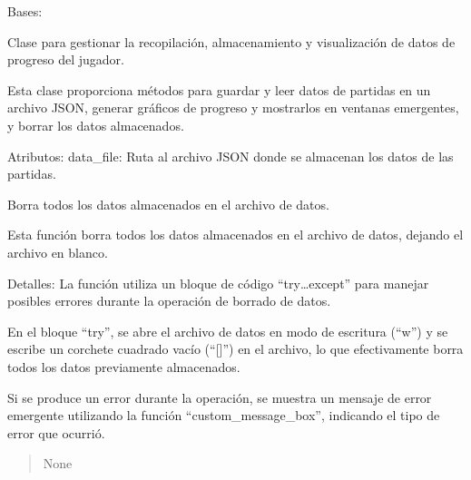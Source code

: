 \documentclass[letterpaper,10pt,spanish]{sphinxmanual}
\begin{document}
\begin{fulllineitems}
\label{\detokenize{datos:datos.GestionDatos}}
\pysigstartsignatures
{}
\pysigstopsignatures
\sphinxAtStartPar
Bases: 

\sphinxAtStartPar
Clase para gestionar la recopilación, almacenamiento y visualización de datos de progreso del jugador.

\sphinxAtStartPar
Esta clase proporciona métodos para guardar y leer datos de partidas en un archivo JSON,
generar gráficos de progreso y mostrarlos en ventanas emergentes, y borrar los datos almacenados.

\sphinxAtStartPar
Atributos:
data\_file: Ruta al archivo JSON donde se almacenan los datos de las partidas.

\begin{fulllineitems}
\label{\detokenize{datos:datos.GestionDatos.borrar_datos}}
\pysigstartsignatures
{}
\pysigstopsignatures
\sphinxAtStartPar
Borra todos los datos almacenados en el archivo de datos.

\sphinxAtStartPar
Esta función borra todos los datos almacenados en el archivo de datos, dejando el archivo en blanco.

\sphinxAtStartPar
Detalles:
La función utiliza un bloque de código “try…except” para manejar posibles errores durante la operación
de borrado de datos.

\sphinxAtStartPar
En el bloque “try”, se abre el archivo de datos en modo de escritura (“w”) y se escribe un corchete
cuadrado vacío (“{[}{]}”) en el archivo, lo que efectivamente borra todos los datos previamente almacenados.

\sphinxAtStartPar
Si se produce un error durante la operación, se muestra un mensaje de error emergente utilizando la función
“custom\_message\_box”, indicando el tipo de error que ocurrió.
\begin{quote}\begin{description}
\sphinxAtStartPar
None

\end{description}\end{quote}


\end{fulllineitems}
\end{fulllineitems}
\end{document}

